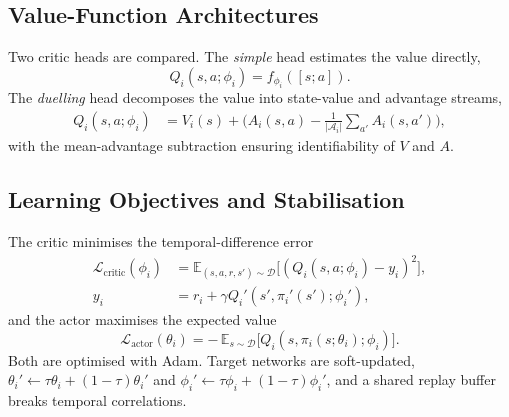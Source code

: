 \documentclass[10pt,journal,comsoc]{IEEEtran}
\begin{document}
\subsection{Value-Function Architectures}
Two critic heads are compared. The \emph{simple} head estimates the value directly,
\begin{equation}
  Q_i(s,a;\phi_i) = f_{\phi_i}([s;a]).
  \label{eq:simple_q}
\end{equation}
The \emph{duelling} head decomposes the value into state-value and advantage streams,
\begin{align}
  Q_i(s,a;\phi_i) &= V_i(s) + \Big(A_i(s,a) - \tfrac{1}{|\mathcal{A}_i|}\!\sum_{a'}A_i(s,a')\Big),
  \label{eq:duelling_decomposition}
\end{align}
with the mean-advantage subtraction ensuring identifiability of $V$ and $A$.

\subsection{Learning Objectives and Stabilisation}
The critic minimises the temporal-difference error
\begin{equation}
  \begin{aligned}
    \mathcal{L}_{\text{critic}}(\phi_i)
      &= \mathbb{E}_{(s,a,r,s')\sim\mathcal{D}}
         \!\big[(Q_i(s,a;\phi_i) - y_i)^2\big], \\
    y_i
      &= r_i + \gamma Q_i'(s',\pi_i'(s');\phi_i'),
  \end{aligned}
  \label{eq:critic_loss_def}
\end{equation}
and the actor maximises the expected value
\begin{equation}
  \mathcal{L}_{\text{actor}}(\theta_i) = -\,\mathbb{E}_{s\sim\mathcal{D}}\!\big[Q_i(s,\pi_i(s;\theta_i);\phi_i)\big].
  \label{eq:actor_loss_def}
\end{equation}
Both are optimised with Adam. Target networks are soft-updated, $\theta_i' \leftarrow \tau\theta_i + (1-\tau)\theta_i'$ and $\phi_i' \leftarrow \tau\phi_i + (1-\tau)\phi_i'$, and a shared replay buffer breaks temporal correlations.
\end{document}
